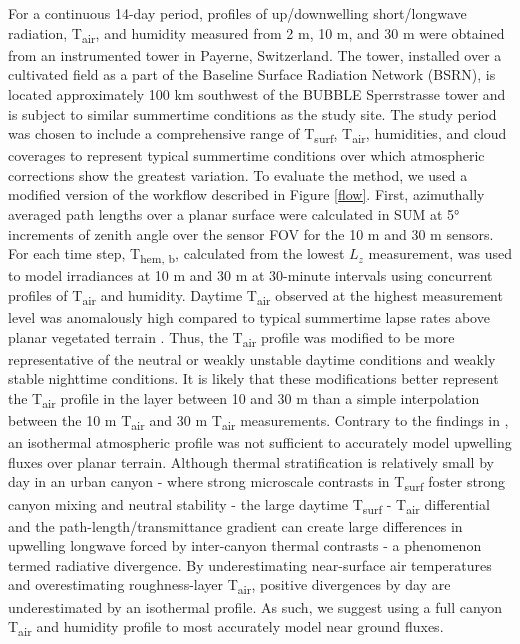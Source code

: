 \begin{bibunit}
For a continuous 14-day period, profiles of up/downwelling short/longwave radiation, T\textsubscript{air}, and humidity measured from 2 \si{m}, 10 \si{m}, and 30 \si{m} were obtained from an instrumented tower in Payerne, Switzerland. The tower, installed over a cultivated field as a part of the Baseline Surface Radiation Network (BSRN), is located approximately 100 \si{\kilo\meter} southwest of the BUBBLE Sperrstrasse tower and is subject to similar summertime conditions as the study site. The study period was chosen to include a comprehensive range of T\textsubscript{surf}, T\textsubscript{air}, humidities, and cloud coverages to represent typical summertime conditions over which atmospheric corrections show the greatest variation. To evaluate the method, we used a modified version of the workflow described in Figure \ref{flow}. First, azimuthally averaged path lengths over a planar surface were calculated in SUM at 5\si{\degree} increments of zenith angle over the sensor FOV for the 10 \si{\meter} and 30 \si{\meter} sensors. For each time step, T\textsubscript{hem, b}, calculated from the lowest $L_z$ measurement, was used to model irradiances at 10 \si{m} and 30 \si{m} at 30-minute intervals using concurrent profiles of T\textsubscript{air} and humidity. Daytime T\textsubscript{air} observed at the highest measurement level was anomalously high compared to typical summertime lapse rates above planar vegetated terrain \citep{Oke1987}. Thus, the T\textsubscript{air} profile was modified to be more representative of the neutral or weakly unstable daytime conditions and weakly stable nighttime conditions. It is likely that these modifications better represent the T\textsubscript{air} profile in the layer between 10 and 30 \si{\meter} than a simple interpolation between the 10 \si{\meter} T\textsubscript{air} and 30 \si{\meter} T\textsubscript{air} measurements. Contrary to the findings in \citet{Kotani2009a}, an isothermal atmospheric profile was not sufficient to accurately model upwelling fluxes over planar terrain. Although thermal stratification is relatively small by day in an urban canyon \citep{Nakamura1988} - where strong microscale contrasts in T\textsubscript{surf} foster strong canyon mixing and neutral stability - the large daytime T\textsubscript{surf} - T\textsubscript{air} differential and the path-length/transmittance gradient can create large differences in upwelling longwave forced by inter-canyon thermal contrasts - a phenomenon termed radiative divergence. By underestimating near-surface air temperatures and overestimating roughness-layer T\textsubscript{air}, positive divergences by day are underestimated by an isothermal profile. As such, we suggest using a full canyon T\textsubscript{air} and humidity profile to most accurately model near ground fluxes.


\end{bibunit}
